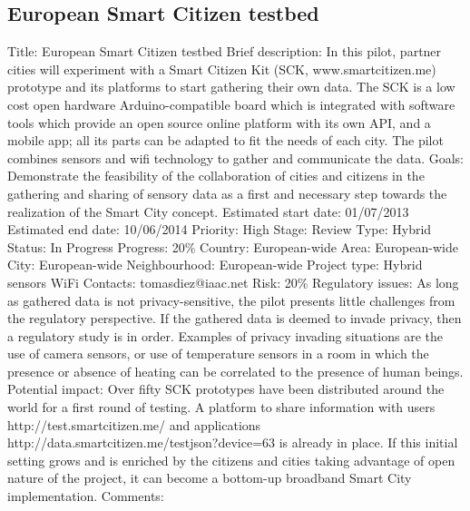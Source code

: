 \documentclass[draftclsnofoot,12pt,journal,onecolumn]{IEEEtran}
\begin{document}
\subsection{European Smart Citizen testbed}
Title: European Smart Citizen testbed
Brief description:
In this pilot, partner cities will experiment with a Smart Citizen Kit (SCK,
www.smartcitizen.me) prototype and its platforms to start gathering their own
data. The SCK is a low cost open hardware Arduino-compatible board which is
integrated with software tools which provide an open source online platform
with its own API,
and a mobile app; all its parts can be adapted to fit the needs of each city.
The pilot combines sensors and wifi technology to gather and communicate the
data.
Goals: Demonstrate the feasibility of the collaboration of cities and
citizens in the gathering and sharing of sensory data as a first and
necessary step towards the realization of the Smart City concept.
Estimated start date: 01/07/2013
Estimated end date: 10/06/2014
Priority: High
Stage: Review
Type: Hybrid
Status: In Progress
Progress: 20\%
Country: European-wide
Area: European-wide
City: European-wide
Neighbourhood: European-wide
Project type: Hybrid sensors WiFi
Contacts: tomasdiez@iaac.net
Risk: 20\%
Regulatory issues: As long as gathered data is not privacy-sensitive, the
pilot presents little challenges from the regulatory perspective. If the
gathered data is deemed to invade privacy, then a regulatory study is in
order. Examples of privacy invading situations are the use of camera sensors,
or use of temperature sensors in a room in which the presence or absence of
heating can be correlated to the presence of human beings.
Potential impact:
Over fifty SCK prototypes have been distributed around the world for a first
round of testing. A platform to share information with users
http://test.smartcitizen.me/
and applications
http://data.smartcitizen.me/testjson?device=63
is already in place. If this initial setting grows and is enriched by the
citizens and cities taking advantage of open nature of the project, it can
become a bottom-up broadband Smart City implementation.
Comments:
\end{document}
